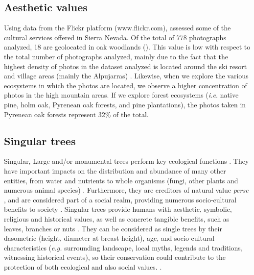 \subsection{Aesthetic values}\label{sec:es:cultural-aesthetic} 
Using data from the Flickr platform (www.flickr.com), \citet{MorenoLlorcaetal2020EvaluatingTourist} assessed some of the cultural services offered in Sierra Nevada. Of the total of 778 photographs analyzed, 18 are geolocated in oak woodlands (). This value is low with respect to the total number of photographs analyzed, mainly due to the fact that the highest density of photos in the dataset analyzed is located around the ski resort and village areas (mainly the Alpujarras) \autocites{RosCandeiraetal2020SocialMedia}. Likewise, when we explore the various ecosystems in which the photos are located, we observe a higher concentration of photos in the high mountain areas. If we explore forest ecosystems (\emph{i.e.} native pine, holm oak, Pyrenean oak forests, and pine plantations), the photos taken in Pyrenean oak forests represent 32\% of the total.

\subsection{Singular trees}\label{sec:es:cultural-trees} 
Singular, Large and/or monumental trees perform key ecological functions \autocites[\emph{e.g.} nutrient cycling; support complex assemblages of species,][]{Zapponietal2017RoleMonumental}. They have important impacts on the distribution and abundance of many other entities, from water and nutrients to whole organisms (fungi, other plants and numerous animal species) \autocites{LindenmayerLaurance2017EcologyDistribution}. Furthermore, they are creditors of natural value \emph{perse} \autocites{Asciutoetal2016MonumentalTrees}, and are considered part of a social realm, providing numerous socio-cultural benefits to society \autocites{BlicharskaMikusinski2014IncorporatingSocial,MoyaMoya2013MonumentalTrees}. Singular trees provide humans with aesthetic, symbolic, religious and historical values, as well as concrete tangible benefits, such as leaves, branches or nuts \autocites{BlicharskaMikusinski2014IncorporatingSocial}. They can be considered as single trees by their dasometric (height, diameter at breast height), age, and socio-cultural characteristics (\emph{e.g.} surrounding landscape, local myths, legends and traditions, witnessing historical events), so their conservation could contribute to the protection of both ecological and also social values. \autocites{BlicharskaMikusinski2014IncorporatingSocial}. 

